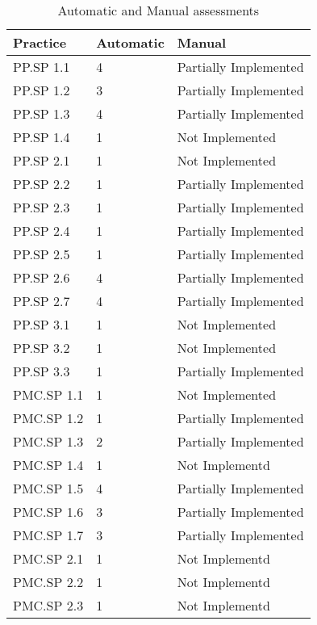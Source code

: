 \begin{table}[h]
	\centering
	\caption{Automatic and Manual assessments}
	\begin{tabular}{|p{2cm}|p{3cm}|p{4cm}|}
		\hline
		Practice  & Automatic & Manual                \\
		\hline
		PP.SP 1.1 & 4         & Partially Implemented \\
		PP.SP 1.2 & 3         & Partially Implemented \\
		PP.SP 1.3 & 4         & Partially Implemented \\
		PP.SP 1.4 & 1         & Not Implemented       \\
		PP.SP 2.1 & 1         & Not Implemented       \\
		PP.SP 2.2 & 1         & Partially Implemented \\
		PP.SP 2.3 & 1         & Partially Implemented \\
		PP.SP 2.4 & 1         & Partially Implemented \\
		PP.SP 2.5 & 1         & Partially Implemented \\
		PP.SP 2.6 & 4         & Partially Implemented \\
		PP.SP 2.7 & 4         & Partially Implemented \\
		PP.SP 3.1 & 1         & Not Implemented       \\
		PP.SP 3.2 & 1         & Not Implemented       \\
		PP.SP 3.3 & 1         & Partially Implemented\\
		PMC.SP 1.1 & 1 & Not Implemented       \\
		PMC.SP 1.2 & 1 & Partially Implemented \\
		PMC.SP 1.3 & 2 & Partially Implemented \\
		PMC.SP 1.4 & 1 & Not Implementd        \\
		PMC.SP 1.5 & 4 & Partially Implemented \\
		PMC.SP 1.6 & 3 & Partially Implemented \\
		PMC.SP 1.7 & 3 & Partially Implemented \\
		PMC.SP 2.1 & 1 & Not Implementd        \\
		PMC.SP 2.2 & 1 & Not Implementd        \\
		PMC.SP 2.3 & 1 & Not Implementd        \\
		\hline
	\end{tabular}
	\label{tab:automaticmanual}
\end{table}